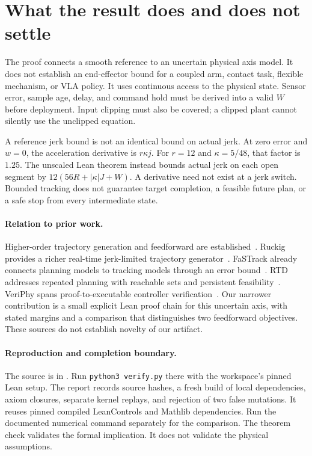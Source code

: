 \documentclass[11pt]{article}
\begin{document}
\section{What the result does and does not settle}
The proof connects a smooth reference to an uncertain physical axis model.
It does not establish an end-effector bound for a coupled arm, contact task, flexible mechanism, or VLA policy.
It uses continuous access to the physical state.
Sensor error, sample age, delay, and command hold must be derived into a valid $W$ before deployment.
Input clipping must also be covered; a clipped plant cannot silently use the unclipped equation.

A reference jerk bound is not an identical bound on actual jerk.
At zero error and $w=0$, the acceleration derivative is $r\kappa j$.
For $r=12$ and $\kappa=5/48$, that factor is $1.25$.
The unscaled Lean theorem instead bounds actual jerk on each open segment by
$12(56R+|\kappa|J+W)$.
A derivative need not exist at a jerk switch.
Bounded tracking does not guarantee target completion, a feasible future plan, or a safe stop from every intermediate state.

\paragraph{Relation to prior work.}
Higher-order trajectory generation and feedforward are established~\cite{lambrechts}.
Ruckig provides a richer real-time jerk-limited trajectory generator~\cite{ruckig}.
FaSTrack already connects planning models to tracking models through an error bound~\cite{fastrack}.
RTD addresses repeated planning with reachable sets and persistent feasibility~\cite{rtd}.
VeriPhy spans proof-to-executable controller verification~\cite{veriphy}.
Our narrower contribution is a small explicit Lean proof chain for this uncertain axis, with stated margins and a comparison that distinguishes two feedforward objectives.
These sources do not establish novelty of our artifact.

\paragraph{Reproduction and completion boundary.}
The source is in .
Run \texttt{python3 verify.py} there with the workspace's pinned Lean setup.
The report records source hashes, a fresh build of local dependencies, axiom closures, separate kernel replays, and rejection of two false mutations.
It reuses pinned compiled LeanControls and Mathlib dependencies.
Run the documented numerical command separately for the comparison.
The theorem check validates the formal implication. It does not validate the physical assumptions.
\end{document}
